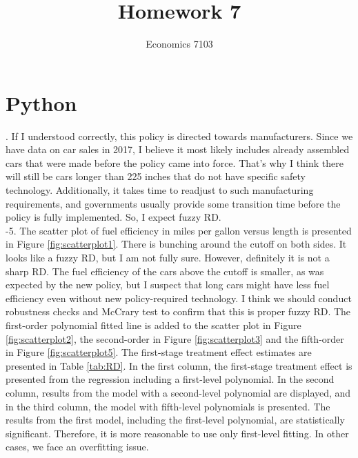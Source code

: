 \documentclass{article}
\title{Homework 7}
\author{Economics 7103}
\begin{document}
  
\maketitle

\section{Python}
. If I understood correctly, this policy is directed towards manufacturers. Since we have data on car sales in 2017, I believe it most likely includes already assembled cars that were made before the policy came into force. That's why I think there will still be cars longer than 225 inches that do not have specific safety technology. Additionally, it takes time to readjust to such manufacturing requirements, and governments usually provide some transition time before the policy is fully implemented. So, I expect fuzzy RD.
\\

-5. The scatter plot of fuel efficiency in miles per gallon versus length is presented in Figure \ref{fig:scatterplot1}. There is bunching around the cutoff on both sides. It looks like a fuzzy RD, but I am not fully sure. However, definitely it is not a sharp RD. The fuel efficiency of the cars above the cutoff is smaller, as was expected by the new policy, but I suspect that long cars might have less fuel efficiency even without new policy-required technology. I think we should conduct robustness checks and McCrary test to confirm that this is proper fuzzy RD. The first-order polynomial fitted line is added to the scatter plot in Figure \ref{fig:scatterplot2}, the second-order in Figure \ref{fig:scatterplot3} and the fifth-order in Figure \ref{fig:scatterplot5}.  The first-stage treatment effect estimates are presented in Table \ref{tab:RD}. In the first column, the first-stage treatment effect is presented from the regression including a first-level polynomial. In the second column, results from the model with a second-level polynomial are displayed, and in the third column, the model with fifth-level polynomials is presented. The results from the first model, including the first-level polynomial, are statistically significant. Therefore, it is more reasonable to use only first-level fitting. In other cases, we face an overfitting issue.
\end{document}

